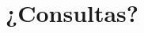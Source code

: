 \documentclass[11pt,a4paper,spanish]{beamer}
\begin{document}

\begin{frame}

\title{¿Consultas?}
\maketitle

\end{frame}
%
%
%
%
%
%
%
\end{document}
